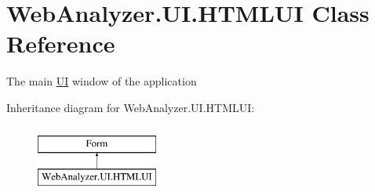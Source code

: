 \hypertarget{class_web_analyzer_1_1_u_i_1_1_h_t_m_l_u_i}{}\section{Web\+Analyzer.\+U\+I.\+H\+T\+M\+L\+U\+I Class Reference}
\label{class_web_analyzer_1_1_u_i_1_1_h_t_m_l_u_i}


The main \hyperlink{namespace_web_analyzer_1_1_u_i}{U\+I} window of the application  


Inheritance diagram for Web\+Analyzer.\+U\+I.\+H\+T\+M\+L\+U\+I\+:\begin{figure}[H]
\begin{center}
\leavevmode
\includegraphics[height=2.000000cm]{class_web_analyzer_1_1_u_i_1_1_h_t_m_l_u_i}
\end{center}
\end{figure}
